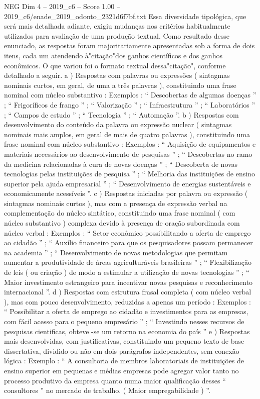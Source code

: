 \begin{textsample}{NEG Dim 4 – 2019\_c6 – Score 1.00 – 2019\_c6/enade\_2019\_odonto\_2321d6f7bf.txt}
Essa diversidade tipológica, que será mais detalhada adiante, exigiu mudanças nos critérios habitualmente utilizados para avaliação de uma produção textual.
Como resultado desse enunciado, as respostas foram majoritariamente apresentadas sob a forma de dois itens, cada um atendendo à"citação"dos ganhos científicos e dos ganhos econômicos.
O que variou foi o formato textual dessa"citação", conforme detalhado a seguir. a ) Respostas com palavras ou expressões ( sintagmas nominais curtos, em geral, de uma a três palavras ), constituindo uma frase nominal com núcleo substantivo : Exemplos : “ Descobertas de algumas doenças ” ; “ Frigoríficos de frango ” ; “ Valorização ” ; “ Infraestrutura ” ; “ Laboratórios ” ; “ Campos de estudo ” ; “ Tecnologia ” ; “ Automação ”. b ) Respostas com desenvolvimento do conteúdo da palavra ou expressão nuclear ( sintagmas nominais mais amplos, em geral de mais de quatro palavras ), constituindo uma frase nominal com núcleo substantivo : Exemplos : “ Aquisição de equipamentos e materiais necessários ao desenvolvimento de pesquisas ” ; “ Descobertas no ramo da medicina relacionadas à cura de novas doenças ” ; “ Descoberta de novas tecnologias pelas instituições de pesquisa ” ; “ Melhoria das instituições de ensino superior pela ajuda empresarial ” ; “ Desenvolvimento de energias sustentáveis e economicamente acessíveis ”. c ) Respostas iniciadas por palavra ou expressão ( sintagmas nominais curtos ), mas com a presença de expressão verbal na complementação do núcleo sintático, constituindo uma frase nominal ( com núcleo substantivo ) complexa devido à presença de oração subordinada com núcleo verbal : Exemplos : “ Setor econômico possibilitando a oferta de emprego ao cidadão ” ; “ Auxílio financeiro para que os pesquisadores possam permanecer na academia ” ; “ Desenvolvimento de novas metodologias que permitam aumentar a produtividade de áreas agriculturáveis brasileiras ” ; “ Flexibilização de leis ( ou criação ) de modo a estimular a utilização de novas tecnologias ” ; “ Maior investimento estrangeiro para incentivar novas pesquisas e reconhecimento internacional ”. d ) Respostas com estrutura frasal completa ( com núcleo verbal ), mas com pouco desenvolvimento, reduzidas a apenas um período : Exemplos : “ Possibilitar a oferta de emprego ao cidadão e investimentos para as empresas, com fácil acesso para o pequeno empresário ” ; “ Investindo nesses recursos de pesquisas cientificas, obteve -se um retorno na economia do país ” e ) Respostas mais desenvolvidas, com justificativas, constituindo um pequeno texto de base dissertativa, dividido ou não em dois parágrafos independentes, sem conexão lógica : Exemplo : “ A consultoria de membros laboratoriais de instituições de ensino superior em pequenas e médias empresas pode agregar valor tanto no processo produtivo da empresa quanto numa maior qualificação desses “ consultores ” no mercado de trabalho. ( Maior empregabilidade ) ”.

\end{textsample}
